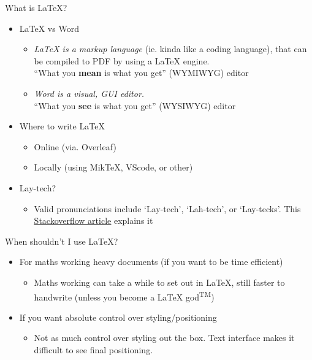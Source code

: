 \documentclass{beamer}
\begin{document}
\begin{frame}[fragile]{What is \LaTeX{}?}
    \begin{itemize}
        \item \LaTeX{} vs Word
        \begin{itemize}
            \item \emph{LaTeX is a markup language} (ie. kinda like a coding language), that can be compiled to PDF by using a LaTeX engine.\\
            ``What you \textbf{mean} is what you get'' (WYMIWYG) editor
            \item \emph{Word is a visual, GUI editor.}\\
            ``What you \textbf{see} is what you get'' (WYSIWYG) editor
        \end{itemize}
        
        \item Where to write LaTeX
        \begin{itemize}
            \item Online (via. Overleaf)
            \item Locally (using MikTeX, VScode, or other)
        \end{itemize}

        \item Lay-tech?
        \begin{itemize}
            \item Valid pronunciations include `Lay-tech', `Lah-tech', or `Lay-tecks'. This \href{https://tex.stackexchange.com/q/17502}{\color{blue}\underline{Stackoverflow article}} explains it
        \end{itemize}
    \end{itemize}
    
\end{frame}

\begin{frame}[fragile]{When shouldn't I use \LaTeX{}?}
    \begin{itemize}
        \item For maths working heavy documents (if you want to be time efficient)
        \begin{itemize}
            \item Maths working can take a while to set out in LaTeX, still faster to handwrite (unless you become a LaTeX god\textsuperscript{TM})
        \end{itemize}

        \item If you want absolute control over styling/positioning
        \begin{itemize}
            \item Not as much control over styling out the box. Text interface makes it difficult to see final positioning.
        \end{itemize}
    \end{itemize}
\end{frame}
\end{document}
